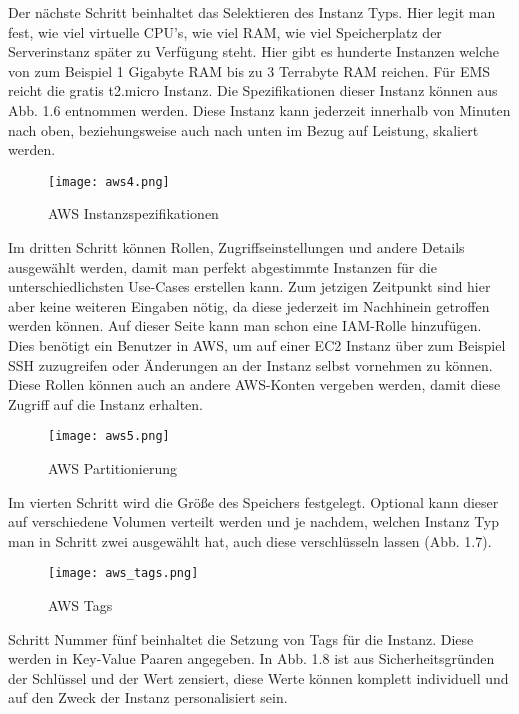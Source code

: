 Der nächste Schritt beinhaltet das Selektieren des Instanz Typs. Hier legit man fest, wie viel virtuelle CPU's, wie viel RAM, wie viel Speicherplatz der Serverinstanz später zu Verfügung steht. Hier gibt es hunderte Instanzen welche von zum Beispiel 1 Gigabyte RAM bis zu 3 Terrabyte RAM reichen. Für EMS reicht die gratis t2.micro Instanz. Die Spezifikationen dieser Instanz können aus Abb. 1.6 entnommen werden. Diese Instanz kann jederzeit innerhalb von Minuten nach oben, beziehungsweise auch nach unten im Bezug auf Leistung, skaliert werden.
\begin{center}
\begin{figure}[H]
    \centering
    \texttt{[image: aws4.png]}
    \caption{AWS Instanzspezifikationen}
\end{figure}
\end{center}
Im dritten Schritt können Rollen, Zugriffseinstellungen und andere Details ausgewählt werden, damit man perfekt abgestimmte Instanzen für die unterschiedlichsten Use-Cases erstellen kann. Zum jetzigen Zeitpunkt sind hier aber keine weiteren Eingaben nötig, da diese jederzeit im Nachhinein getroffen werden können. Auf dieser Seite kann man schon eine IAM-Rolle hinzufügen. Dies benötigt ein Benutzer in AWS, um auf einer EC2 Instanz über zum Beispiel SSH zuzugreifen oder Änderungen an der Instanz selbst vornehmen zu können. Diese Rollen können auch an andere AWS-Konten vergeben werden, damit diese Zugriff auf die Instanz erhalten.
\begin{center}
\begin{figure}[H]
    \centering
    \texttt{[image: aws5.png]}
    \caption{AWS Partitionierung}
\end{figure}
\end{center}
Im vierten Schritt wird die Größe des Speichers festgelegt. Optional kann dieser auf verschiedene Volumen verteilt werden und je nachdem, welchen Instanz Typ man in Schritt zwei ausgewählt hat, auch diese verschlüsseln lassen (Abb. 1.7).
\begin{center}
\begin{figure}[H]
    \centering
    \texttt{[image: aws\_tags.png]}
    \caption{AWS Tags}
\end{figure}
\end{center}
Schritt Nummer fünf beinhaltet die Setzung von Tags für die Instanz. Diese werden in Key-Value Paaren angegeben. In Abb. 1.8 ist aus Sicherheitsgründen der Schlüssel und der Wert zensiert, diese Werte können komplett individuell und auf den Zweck der Instanz personalisiert sein.
